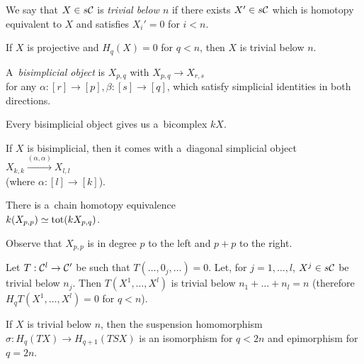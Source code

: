     \begin{definition}
        We say that $X \in s\mathcal{C}$ is {\em trivial below $n$}
        if there exists $X' \in s\mathcal{C}$ which is homotopy equivalent to $X$
        and satisfies $X_i' = 0$ for $i<n$.
    \end{definition}
    
    \begin{lemma}
        If $X$ is projective and $H_q(X) = 0$
        for $q<n$, then $X$ is trivial below $n$.
    \end{lemma}
    
    \begin{remark}[digression]
        A~{\em bisimplicial object}
        is $X_{p,q}$ with $X_{p,q} \to X_{r,s}$
        \\for any $\alpha:[r]\to [p], \beta:[s]\to [q]$,
        which satisfy simplicial identities in both directions.
        
        Every bisimplicial object gives us a~bicomplex $kX$.
        
        If $X$ is bisimplicial, then it comes with a~diagonal
        simplicial object $X_{k,k} \xrightarrow{(\alpha,\alpha)} X_{l,l}$
        \\ (where $\alpha:[l]\to[k]$).
    \end{remark}
    
    \begin{theorem}
        There is a~chain homotopy equivalence 
        \\$k(X_{p,p}) \simeq {\mathrm{tot}}(k X_{p,q})$.
    \end{theorem}
    
    \begin{remark}
        Observe that $X_{p,p}$ is in degree $p$
        to the left and $p+p$ to the right.
    \end{remark}
    
    \begin{proposition}
        Let $T:\mathcal{C}^l \to \mathcal{C}'$
        be such that $T(\ldots, 0_j, \ldots) = 0$.
        Let, for $j=1, \ldots, l$, $X^j \in s\mathcal{C}$ be trivial below $n_j$.
        Then $T(X^1, \ldots, X^l)$ is trivial below $n_1 + \ldots + n_l = n$
        (therefore $H_q T(X^1, \ldots, X^l) = 0$ for $q < n$).
    \end{proposition}
    
    \begin{corollary}
        If $X$ is trivial below $n$, then the suspension homomorphism
        \\$\sigma:H_q(TX) \to H_{q+1}(TSX)$ is an isomorphism
        for $q<2n$ and epimorphism for $q = 2n$.
    \end{corollary}
    
